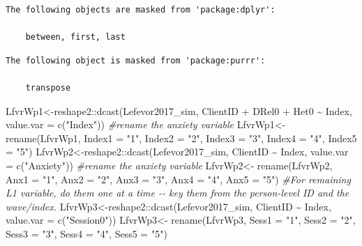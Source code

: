 \documentclass[
  english,
]{book}
\newenvironment{Shaded}{\begin{snugshade}}{\end{snugshade}}
\newcommand{\AttributeTok}[1]{\textcolor[rgb]{0.77,0.63,0.00}{#1}}
\newcommand{\CommentTok}[1]{\textcolor[rgb]{0.56,0.35,0.01}{\textit{#1}}}
\newcommand{\FunctionTok}[1]{\textcolor[rgb]{0.00,0.00,0.00}{#1}}
\newcommand{\NormalTok}[1]{#1}
\newcommand{\OtherTok}[1]{\textcolor[rgb]{0.56,0.35,0.01}{#1}}
\newcommand{\SpecialCharTok}[1]{\textcolor[rgb]{0.00,0.00,0.00}{#1}}
\newcommand{\StringTok}[1]{\textcolor[rgb]{0.31,0.60,0.02}{#1}}
\begin{document}
\begin{verbatim}
The following objects are masked from 'package:dplyr':

    between, first, last
\end{verbatim}

\begin{verbatim}
The following object is masked from 'package:purrr':

    transpose
\end{verbatim}

\begin{Shaded}
\begin{Highlighting}[]
\NormalTok{LfvrWp1}\OtherTok{\textless{}{-}}\NormalTok{reshape2}\SpecialCharTok{::}\FunctionTok{dcast}\NormalTok{(Lefevor2017\_sim, ClientID }\SpecialCharTok{+}\NormalTok{ DRel0 }\SpecialCharTok{+}\NormalTok{ Het0 }\SpecialCharTok{\textasciitilde{}}\NormalTok{ Index, }\AttributeTok{value.var =} \FunctionTok{c}\NormalTok{(}\StringTok{"Index"}\NormalTok{))}
\CommentTok{\#rename the anxiety variable}
\NormalTok{LfvrWp1}\OtherTok{\textless{}{-}}  \FunctionTok{rename}\NormalTok{(LfvrWp1, }\AttributeTok{Index1 =} \StringTok{"1"}\NormalTok{, }\AttributeTok{Index2 =} \StringTok{"2"}\NormalTok{, }\AttributeTok{Index3 =} \StringTok{"3"}\NormalTok{, }\AttributeTok{Index4 =} \StringTok{"4"}\NormalTok{, }\AttributeTok{Index5 =} \StringTok{"5"}\NormalTok{)}
\NormalTok{LfvrWp2}\OtherTok{\textless{}{-}}\NormalTok{reshape2}\SpecialCharTok{::}\FunctionTok{dcast}\NormalTok{(Lefevor2017\_sim, ClientID }\SpecialCharTok{\textasciitilde{}}\NormalTok{ Index, }\AttributeTok{value.var =} \FunctionTok{c}\NormalTok{(}\StringTok{"Anxiety"}\NormalTok{))}
\CommentTok{\#rename the anxiety variable}
\NormalTok{LfvrWp2}\OtherTok{\textless{}{-}}  \FunctionTok{rename}\NormalTok{(LfvrWp2, }\AttributeTok{Anx1 =} \StringTok{"1"}\NormalTok{, }\AttributeTok{Anx2 =} \StringTok{"2"}\NormalTok{, }\AttributeTok{Anx3 =} \StringTok{"3"}\NormalTok{, }\AttributeTok{Anx4 =} \StringTok{"4"}\NormalTok{, }\AttributeTok{Anx5 =} \StringTok{"5"}\NormalTok{)}
\CommentTok{\#For remaining L1 variable, do them one at a time {-}{-} key them from the person{-}level ID and the wave/index.}
\NormalTok{LfvrWp3}\OtherTok{\textless{}{-}}\NormalTok{reshape2}\SpecialCharTok{::}\FunctionTok{dcast}\NormalTok{(Lefevor2017\_sim, ClientID }\SpecialCharTok{\textasciitilde{}}\NormalTok{ Index, }\AttributeTok{value.var =} \FunctionTok{c}\NormalTok{(}\StringTok{"Session0"}\NormalTok{))}
\NormalTok{LfvrWp3}\OtherTok{\textless{}{-}}  \FunctionTok{rename}\NormalTok{(LfvrWp3, }\AttributeTok{Sess1 =} \StringTok{"1"}\NormalTok{, }\AttributeTok{Sess2 =} \StringTok{"2"}\NormalTok{, }\AttributeTok{Sess3 =} \StringTok{"3"}\NormalTok{, }\AttributeTok{Sess4 =} \StringTok{"4"}\NormalTok{, }\AttributeTok{Sess5 =} \StringTok{"5"}\NormalTok{)}

\end{Highlighting}
\end{Shaded}
\end{document}
